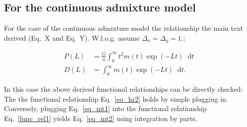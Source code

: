 \documentclass[11pt]{article}
\newcommand*\diff{\mathop{}\!\mathrm{d}}
\begin{document}
\subsection{For the continuous admixture model}
For the case of the continuous admixture model the relationship the main text derived (Eq.~X and Eq.~Y). W.l.o.g. assume $\Delta_x = \Delta_y = 1$.:

\begin{align}
P(L) &= \frac{G}{n}\int_{0}^{\infty} t^2 m(t) \exp(-Lt) \diff t \label{eq_mt1} \\
    D(L) &= \int_0^{\infty} m(t)\exp(-Lt) \diff t \text{.} \label{eq_mt2}
\end{align}

 In this case the above derived functional relationships can be directly checked:  The the functional relationship Eq.~\ref{eq_hr2} holds by simple plugging in. Conversely, plugging Eq.~\ref{eq_mt1} into the functional relationship Eq.~\ref{func_rel1} yields Eq.~\ref{eq_mt2} using integration by parts.
\end{document}
